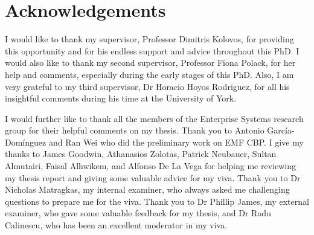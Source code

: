 \documentclass[11pt, a4paper]{report} \usepackage[titletoc]{appendix}
\begin{document}
  \tableofcontents
  
  \cleardoublepage
  \listoffigures
  
  \cleardoublepage
  \listoftables
  
  \cleardoublepage
  \lstlistoflistings
  
  \cleardoublepage
  
  \cleardoublepage
  \chapter*{Acknowledgements}
  I would like to thank my supervisor, Professor Dimitris Kolovos, for providing this opportunity and for his endless support and advice throughout this PhD. I would also like to thank my second supervisor, Professor Fiona Polack, for her help and comments, especially during the early stages of this PhD. Also, I am very grateful to my third supervisor, Dr Horacio Hoyos Rodriguez, for all his insightful comments during his time at the University of York.
  
  I would further like to thank all the members of the Enterprise Systems research group for their helpful comments on my thesis. Thank you to Antonio García-Domínguez and Ran Wei who did the preliminary work on EMF CBP. I give my thanks to James Goodwin, Athanasios Zolotas, Patrick Neubauer, Sultan Almutairi, Faisal Alhwikem, and Alfonso De La Vega for helping me reviewing my thesis report and giving some valuable advice for my viva. Thank you to Dr Nicholas Matragkas, my internal examiner, who always asked me challenging questions to prepare me for the viva. Thank you to Dr Phillip James, my external examiner, who gave some valuable feedback for my thesis, and Dr Radu Calinescu, who has been an excellent moderator in my viva.
  
\end{document}
